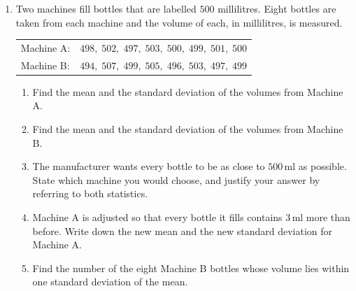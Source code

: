 \documentclass[12pt, twoside]{article}
\begin{document}
\begin{enumerate}[itemsep=0.15cm]
\newpage

\item[2.]

Two machines fill bottles that are labelled $500$ millilitres. Eight
bottles are taken from each machine and the volume of each, in millilitres,
is measured.

\begin{center}
\setlength{\tabcolsep}{8pt}\renewcommand{\arraystretch}{1.2}
\begin{tabular}{ll}
Machine A: & $498,\; 502,\; 497,\; 503,\; 500,\; 499,\; 501,\; 500$ \\
Machine B: & $494,\; 507,\; 499,\; 505,\; 496,\; 503,\; 497,\; 499$ \\
\end{tabular}
\end{center}

\begin{enumerate}[itemsep=0.1cm]
  \item Find the mean and the standard deviation of the volumes from
  Machine A.
  \item Find the mean and the standard deviation of the volumes from
  Machine B.
  \item The manufacturer wants every bottle to be as close to $500$\,ml as
  possible. State which machine you would choose, and justify your answer by
  referring to both statistics.
  \item Machine A is adjusted so that every bottle it fills contains
  $3$\,ml more than before. Write down the new mean and the new standard
  deviation for Machine A.
  \item Find the number of the eight Machine B bottles whose volume lies
  within one standard deviation of the mean.
\end{enumerate}


\end{enumerate}
\end{document}
